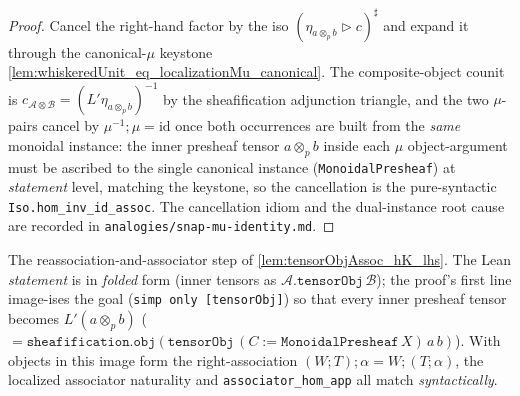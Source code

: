 \begin{proof}
  Cancel the right-hand factor by the iso \((\eta_{a\otimes_p b}\rhd c)^{\sharp}\) and expand it through
  the canonical-\(\mu\) keystone \cref{lem:whiskeredUnit_eq_localizationMu_canonical}. The composite-object
  counit is \(c_{\mathcal{A}\otimes\mathcal{B}} = (L'\eta_{a\otimes_p b})^{-1}\) by the sheafification
  adjunction triangle, and the two \(\mu\)-pairs cancel by \(\mu^{-1};\mu=\mathrm{id}\) once both
  occurrences are built from the \emph{same} monoidal instance: the inner presheaf tensor
  \(a\otimes_p b\) inside each \(\mu\) object-argument must be ascribed to the single canonical instance
  (\texttt{MonoidalPresheaf}) at \emph{statement} level, matching the keystone, so the cancellation is the
  pure-syntactic \texttt{Iso.hom\_inv\_id\_assoc}. The cancellation idiom and the dual-instance root cause
  are recorded in \texttt{analogies/snap-mu-identity.md}.
\end{proof}

\begin{lemma}



  \label{lem:tensorObjAssoc_hK_lhs_native}
  The reassociation-and-associator step of \cref{lem:tensorObjAssoc_hK_lhs}. The Lean \emph{statement}
  is in \emph{folded} form (inner tensors as \(\mathcal A.\texttt{tensorObj}\,\mathcal B\)); the proof's
  first line image-ises the goal (\texttt{simp only [tensorObj]}) so that every inner presheaf tensor
  becomes \(L'(a\otimes_p b)\) (\(=\texttt{sheafification.obj}(\texttt{tensorObj}\,(C:=\texttt{MonoidalPresheaf}\,X)\,a\,b)\)).
  With objects in this image form the right-association \((W;T);\alpha = W;(T;\alpha)\), the localized
  associator naturality and \texttt{associator\_hom\_app} all match \emph{syntactically}.
\end{lemma}


